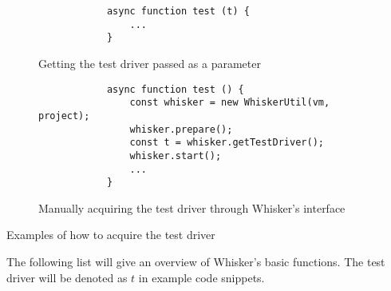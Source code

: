 \begin{listing}[htpb]
    \centering
    \begin{subfigure}[b]{.35\textwidth}
        \begin{verbatim}
            async function test (t) {
                ...
            }
        \end{verbatim}
        \vspace{-\bigskipamount}
        \caption{Getting the test driver passed as a parameter}
    \end{subfigure}
    \hspace{.05\textwidth}
    \begin{subfigure}[b]{.50\textwidth}
        \begin{verbatim}
            async function test () {
                const whisker = new WhiskerUtil(vm, project);
                whisker.prepare();
                const t = whisker.getTestDriver();
                whisker.start();
                ...
            }
        \end{verbatim}
        \vspace{-\bigskipamount}
        \caption{Manually acquiring the test driver through Whisker's interface}
    \end{subfigure}
    \caption{Examples of how to acquire the test driver}
    \label{fig:examples_of_how_to_acquire_the_test_driver}
\end{listing}

The following list will give an overview of Whisker's basic functions.
The test driver will be denoted as $t$ in example code snippets.

